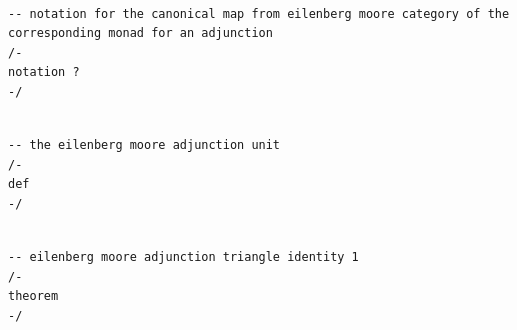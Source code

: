 \documentclass{book}
\newcounter{lcounter}
\begin{document}
\begin{center}
\begin{tcolorbox}[width=5in,colback={white},title={\begin{center}\texttt{Lean \thelcounter} \addtocounter{lcounter}{1}  \end{center}},colbacktitle=Blue,coltitle=black]
\begin{verbatim}

-- notation for the canonical map from eilenberg moore category of the corresponding monad for an adjunction
/-
notation ?
-/

\end{verbatim}%
\end{tcolorbox}
\end{center}



\begin{center}
\begin{tcolorbox}[width=5in,colback={white},title={\begin{center}\texttt{Lean \thelcounter} \addtocounter{lcounter}{1}  \end{center}},colbacktitle=Blue,coltitle=black]
\begin{verbatim}

-- the eilenberg moore adjunction unit 
/-
def 
-/

\end{verbatim}%
\end{tcolorbox}
\end{center}



\begin{center}
\begin{tcolorbox}[width=5in,colback={white},title={\begin{center}\texttt{Lean \thelcounter} \addtocounter{lcounter}{1}  \end{center}},colbacktitle=Blue,coltitle=black]
\begin{verbatim}

-- eilenberg moore adjunction triangle identity 1
/-
theorem
-/

\end{verbatim}%
\end{tcolorbox}
\end{center}
\end{document}
